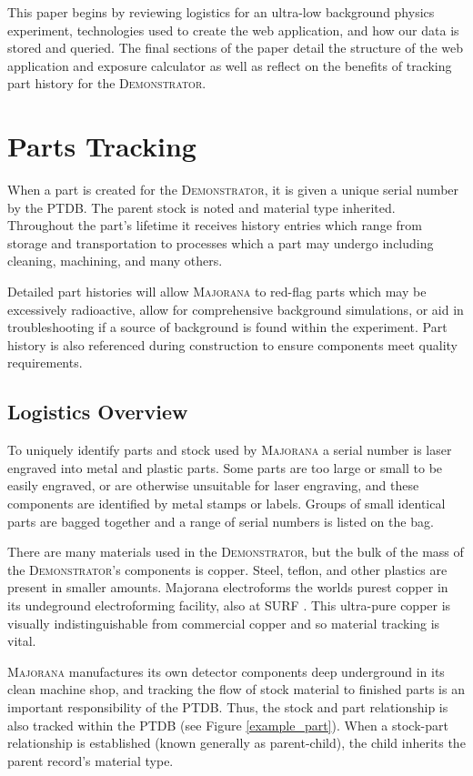 \documentclass[journal]{IEEEtran}
\begin{document}
This paper begins by reviewing logistics for an ultra-low background
physics experiment, technologies used to create the web application, and
how our data is stored and queried. The final sections of the paper detail
the structure of the web application and exposure calculator as well as reflect
on the benefits of tracking part history for the \textsc{Demonstrator}.

\section{Parts Tracking}
When a part is created for the \textsc{Demonstrator}, it is given a unique serial number by the PTDB. The parent stock
is noted and material type inherited. Throughout the part's lifetime it receives history entries which range from storage
and transportation to processes which a part may undergo including cleaning, machining, and many others.

Detailed part histories will allow \textsc{Majorana}
to red-flag parts which may be excessively radioactive, allow for comprehensive background simulations,
or aid in troubleshooting if a source of background is found within the experiment.
Part history is also referenced during construction to ensure components meet quality requirements.

\subsection{Logistics Overview}

To uniquely identify parts and stock used by \textsc{Majorana} a serial number is laser engraved into metal and plastic parts.
Some parts are too large or small to be easily engraved, or are otherwise unsuitable for laser engraving, and these
components are identified by metal stamps or labels. Groups of small identical parts are bagged together
and a range of serial numbers is listed on the bag.

There are many materials used in the \textsc{Demonstrator}, but the bulk of the mass of the \textsc{Demonstrator}'s components is copper.
Steel, teflon, and other plastics are 
present in smaller amounts. Majorana electroforms the worlds purest copper in its undeground electroforming facility, also at SURF \cite{mj_wilkerson}.
This ultra-pure copper is visually indistinguishable from commercial copper and so material
tracking is vital.

\textsc{Majorana} manufactures its own detector components deep underground in its clean machine shop, and tracking the 
flow of stock material to finished parts is an important responsibility of the PTDB.
Thus, the stock and part relationship is also tracked
within the PTDB (see Figure \ref{example_part}).  When a stock-part relationship is established (known generally as parent-child),
the child inherits the parent record's material type. 
\end{document}
